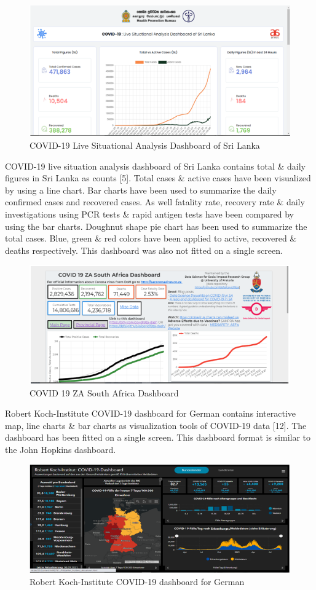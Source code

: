 \documentclass[
]{article}
\begin{document}
\begin{figure}
\includegraphics[width=8.4in]{Images/13} \caption{COVID-19 Live Situational Analysis Dashboard of Sri Lanka}\label{fig:unnamed-chunk-20}
\end{figure}

COVID-19 live situation analysis dashboard of Sri Lanka contains total
\& daily figures in Sri Lanka as counts {[}5{]}. Total cases \& active
cases have been visualized by using a line chart. Bar charts have been
used to summarize the daily confirmed cases and recovered cases. As well
fatality rate, recovery rate \& daily investigations using PCR tests \&
rapid antigen tests have been compared by using the bar charts. Doughnut
shape pie chart has been used to summarize the total cases. Blue, green
\& red colors have been applied to active, recovered \& deaths
respectively. This dashboard was also not fitted on a single screen.

\begin{figure}
\includegraphics[width=8.46in]{Images/14} \caption{COVID 19 ZA South Africa Dashboard}\label{fig:unnamed-chunk-21}
\end{figure}

Robert Koch-Institute COVID-19 dashboard for German contains interactive
map, line charts \& bar charts as visualization tools of COVID-19 data
{[}12{]}. The dashboard has been fitted on a single screen. This
dashboard format is similar to the John Hopkins dashboard.

\begin{figure}
\includegraphics[width=8.33in]{Images/15} \caption{Robert Koch-Institute COVID-19 dashboard for German}\label{fig:unnamed-chunk-22}
\end{figure}
\end{document}
